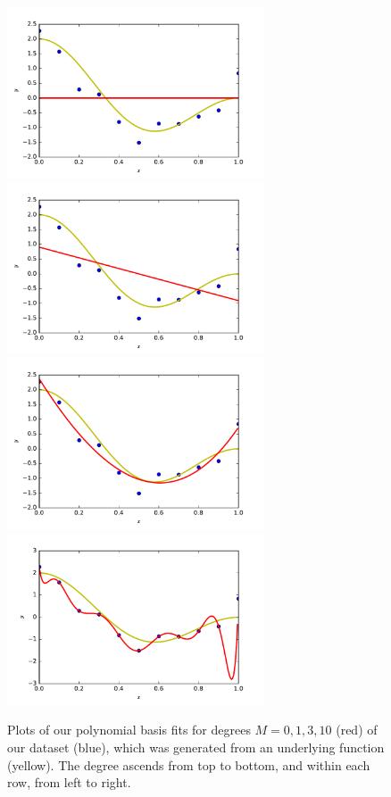 \documentclass{article}
\begin{document}
\begin{multicols}{2}
\begin{figure} %
   \centering
   \includegraphics[width=3in]{img/2-1_degree0.pdf}  %
   \includegraphics[width=3in]{img/2-1_degree1.pdf}  %
   \includegraphics[width=3in]{img/2-1_degree3.pdf}  %
   \includegraphics[width=3in]{img/2-1_degree10.pdf}  %
   \caption{Plots of our polynomial basis fits for degrees $M=0,1,3,10$ (red) of our dataset (blue), which was generated from an underlying function (yellow).
   The degree ascends from top to bottom, and within each row, from left to right.}
   \label{fig:2.1-polybasis}
\end{figure}


\end{multicols}
\end{document}
